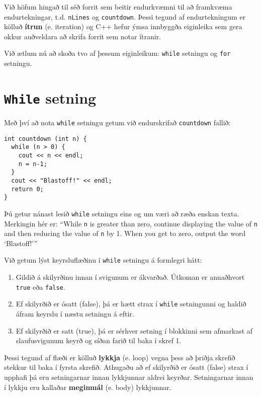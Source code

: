 Við höfum hingað til séð forrit sem beitir endurkvæmni til að framkvæma endurtekningar, t.d. {\tt nLines} og {\tt countdown}.
Þessi tegund af endurtekningum er kölluð {\bf ítrun} (e. iteration) og C++ hefur ýmsa innbyggða eiginleika sem gera okkur auðveldara að skrifa forrit sem notar ítranir.

Við ætlum nú að skoða tvo af þessum eiginleikum:
{\tt while} setningu og {\tt for} setningu.

\section{{\tt While} setning}

Með því að nota {\tt while} setningu getum við endurskrifað {\tt countdown} fallið:

\begin{verbatim}
int countdown (int n) {
  while (n > 0) {
    cout << n << endl;
    n = n-1;
  }
  cout << "Blastoff!" << endl;
  return 0;
}
\end{verbatim}
%
Þú getur nánast lesið {\tt while} setningu eins og um væri að ræða enskan texta.
Merkingin hér er: ``While {\tt n} is greater than
zero, continue displaying the value of {\tt n} and then reducing
the value of {\tt n} by 1.  When you get to zero, output the
word `Blastoff!'''

Við getum lýst keyrsluflæðinu í {\tt while} setningu á formlegri hátt:

\begin{enumerate}

\item Gildið á skilyrðinu innan í svigunum er ákvarðað. Útkoman er annaðhvort {\tt true} eða {\tt false}.

\item Ef skilyrðið er ósatt (false), þá er hætt strax í {\tt while} setningunni og haldið áfram keyrslu í næstu setningu á eftir.

\item Ef skilyrðið er satt (true), þá er sérhver setning í blokkinni sem afmarkast af slaufusvigunum keyrð og síðan farið til baka í skref 1.

\end{enumerate}

Þessi tegund af flæði er kölluð {\bf lykkja} (e. loop) vegna þess að þriðja skrefið stekkur til baka í fyrsta skrefið.
Athugaðu að ef skilyrðið er ósatt (false) strax í upphafi þá eru setningarnar innan lykkjunnar aldrei keyrðar.
Setningarnar innan í lykkju eru kallaðar {\bf meginmál} (e. body) lykkjunnar.

